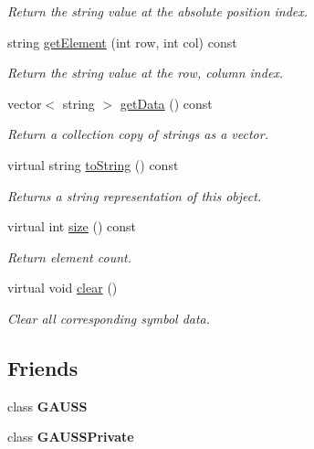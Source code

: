 \begin{DoxyCompactItemize}
\begin{DoxyCompactList}\small\item\em Return the string value at the absolute position {\itshape index}. \end{DoxyCompactList}\item 
string \hyperlink{class_g_e_string_array_a7cbab2172f27fe4c19ee4b07cdab750e}{get\-Element} (int row, int col) const 
\begin{DoxyCompactList}\small\item\em Return the string value at the {\itshape row}, {\itshape column} index. \end{DoxyCompactList}\item 
vector$<$ string $>$ \hyperlink{class_g_e_string_array_ab773ead84f2563d5db4cb8055323f618}{get\-Data} () const 
\begin{DoxyCompactList}\small\item\em Return a collection copy of strings as a vector. \end{DoxyCompactList}\item 
virtual string \hyperlink{class_g_e_string_array_af561837dd261d89c356d1c9cf428b1d5}{to\-String} () const 
\begin{DoxyCompactList}\small\item\em Returns a string representation of this object. \end{DoxyCompactList}\item 
virtual int \hyperlink{class_g_e_string_array_aab1e6ad88ece669100fab114efe43b43}{size} () const 
\begin{DoxyCompactList}\small\item\em Return element count. \end{DoxyCompactList}\item 
virtual void \hyperlink{class_g_e_string_array_a9bd5bd32a9efeb1e74128bd1d7c5c57d}{clear} ()
\begin{DoxyCompactList}\small\item\em Clear all corresponding symbol data. \end{DoxyCompactList}\end{DoxyCompactItemize}
\subsection*{Friends}
\begin{DoxyCompactItemize}
\item 
\hypertarget{class_g_e_string_array_abc89e64d0ec6c939575c3125753c6309}{class {\bfseries G\-A\-U\-S\-S}}\label{class_g_e_string_array_abc89e64d0ec6c939575c3125753c6309}

\item 
\hypertarget{class_g_e_string_array_a2e5e14117f0e69078f45b8d512f056de}{class {\bfseries G\-A\-U\-S\-S\-Private}}\label{class_g_e_string_array_a2e5e14117f0e69078f45b8d512f056de}

\end{DoxyCompactItemize}

